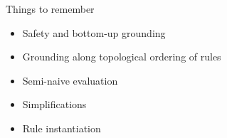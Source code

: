 \begin{frame}{Things to remember}
  \bigskip
  \begin{itemize}
  \item Safety and bottom-up grounding
  \item Grounding along topological ordering of rules
  \item Semi-naive evaluation
  \item Simplifications
  \item Rule instantiation
  \end{itemize}
\end{frame}
%
